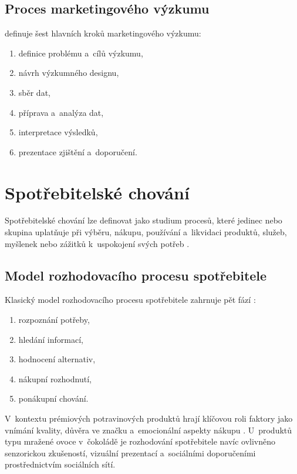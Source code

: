 \subsection{Proces marketingového výzkumu}

\textcite{malhotra_2019} definuje šest hlavních kroků marketingového výzkumu:
\begin{enumerate}
  \item definice problému a~cílů výzkumu,
  \item návrh výzkumného designu,
  \item sběr dat,
  \item příprava a~analýza dat,
  \item interpretace výsledků,
  \item prezentace zjištění a~doporučení.
\end{enumerate}

\section{Spotřebitelské chování}
\label{sec:theory_consumer}

Spotřebitelské chování lze definovat jako studium procesů, které jedinec nebo skupina uplatňuje při výběru, nákupu, používání a~likvidaci produktů, služeb, myšlenek nebo zážitků k~uspokojení svých potřeb \parencite{solomon_2020}.

\subsection{Model rozhodovacího procesu spotřebitele}

Klasický model rozhodovacího procesu spotřebitele zahrnuje pět fází \parencite{kotler_keller_2016}:
\begin{enumerate}
  \item rozpoznání potřeby,
  \item hledání informací,
  \item hodnocení alternativ,
  \item nákupní rozhodnutí,
  \item ponákupní chování.
\end{enumerate}

V~kontextu prémiových potravinových produktů hrají klíčovou roli faktory jako vnímání kvality, důvěra ve značku a~emocionální aspekty nákupu \parencite{vysekalova_2011}. U~produktů typu mražené ovoce v~čokoládě je rozhodování spotřebitele navíc ovlivněno senzorickou zkušeností, vizuální prezentací a~sociálními doporučeními prostřednictvím sociálních sítí.

